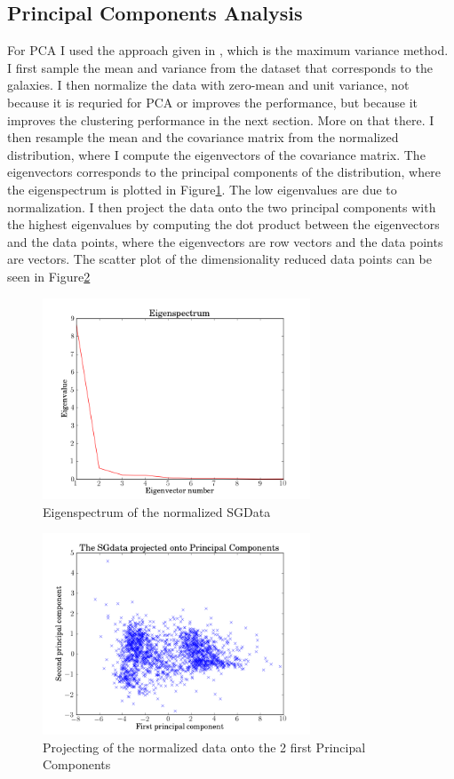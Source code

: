 \documentclass{article}
\theoremstyle{plain}
\theoremstyle{nonumberplain}
\begin{document}
\subsection{Principal Components Analysis}

For PCA I used the approach given in \cite[pp. 561-563]{bishop}, which is the maximum variance method. 
I first sample the mean and variance from the dataset that corresponds to the galaxies. 
I then normalize the data with zero-mean and unit variance, not because it is requried for PCA or improves the performance, but because it improves the clustering performance in the next section.
More on that there.
I then resample the mean and the covariance matrix from the normalized distribution, where I compute the eigenvectors of the covariance matrix.
The eigenvectors corresponds to the principal components of the distribution, where the eigenspectrum is plotted in Figure\ref{fig:eigen}.
The low eigenvalues are due to normalization.
I then project the data onto the two principal components with the highest eigenvalues by computing the dot product between the eigenvectors and the data points, where the eigenvectors are row vectors and the data points are vectors.
The scatter plot of the dimensionality reduced data points can be seen in Figure\ref{fig:projecting}

\begin{figure}[htb]
\centering
\includegraphics[height=6cm]{Images/eigenspectrum.png}
\caption{Eigenspectrum of the normalized SGData}
\label{fig:eigen}
\end{figure}


\begin{figure}[hbt]
\centering
\includegraphics[height=6cm]{Images/PCA_scatter.png}
\caption{Projecting of the normalized data onto the 2 first Principal Components}
\label{fig:projecting}
\end{figure}
\end{document}
